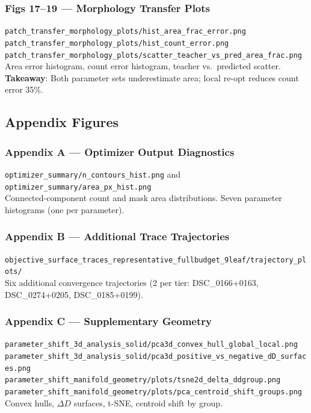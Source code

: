 \documentclass[11pt,a4paper]{article}
\newcommand{\filepath}[1]{\texttt{\small #1}}
\begin{document}
\subsubsection{Figs 17--19 --- Morphology Transfer Plots}
\filepath{patch\_transfer\_morphology\_plots/hist\_area\_frac\_error.png}\\
\filepath{patch\_transfer\_morphology\_plots/hist\_count\_error.png}\\
\filepath{patch\_transfer\_morphology\_plots/scatter\_teacher\_vs\_pred\_area\_frac.png}\\
Area error histogram, count error histogram, teacher vs.\ predicted scatter.\\
\textbf{Takeaway}: Both parameter sets underestimate area; local re-opt reduces count error 35\%.

\subsection{Appendix Figures}

\subsubsection{Appendix A --- Optimizer Output Diagnostics}
\filepath{optimizer\_summary/n\_contours\_hist.png} and \filepath{optimizer\_summary/area\_px\_hist.png}\\
Connected-component count and mask area distributions.  Seven parameter histograms (one per parameter).

\subsubsection{Appendix B --- Additional Trace Trajectories}
\filepath{objective\_surface\_traces\_representative\_fullbudget\_9leaf/trajectory\_plots/}\\
Six additional convergence trajectories (2 per tier: DSC\_0166+0163, DSC\_0274+0205, DSC\_0185+0199).

\subsubsection{Appendix C --- Supplementary Geometry}
\filepath{parameter\_shift\_3d\_analysis\_solid/pca3d\_convex\_hull\_global\_local.png}\\
\filepath{parameter\_shift\_3d\_analysis\_solid/pca3d\_positive\_vs\_negative\_dD\_surfaces.png}\\
\filepath{parameter\_shift\_manifold\_geometry/plots/tsne2d\_delta\_ddgroup.png}\\
\filepath{parameter\_shift\_manifold\_geometry/plots/pca\_centroid\_shift\_groups.png}\\
Convex hulls, $\Delta D$ surfaces, t-SNE, centroid shift by group.
\end{document}
